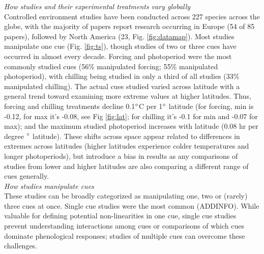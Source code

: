 \documentclass[11pt,letter]{article}
\begin{document}
\emph{How studies and their experimental treatments vary globally}\\
Controlled environment studies have been conducted across 227 species across the globe, with the majority of papers report research occurring in Europe (54 of 85 papers), followed by North America (23, Fig. \ref{fig:datamap}). Most studies manipulate one cue (Fig. \ref{fig:ts}), though studies of two or three cues have occurred in almost every decade. Forcing and photoperiod were the most commonly studied cues (56\% manipulated forcing; 55\% manipulated photoperiod), with chilling being studied in only a third of all studies (33\% manipulated chilling). The actual cues studied varied across latitude with a general trend toward examining more extreme values at higher latitudes. Thus, forcing and chilling treatments decline 0.1$\degree$C per 1$\degree$ latitude (for forcing, min is -0.12, for max it's -0.08, see Fig \ref{fig:lat}; for chilling it's -0.1 for min and -0.07 for max); and the maximum studied photoperiod increases with latitude (0.08 hr per degree $\degree$ latitude). These shifts across space appear related to differences in extremes across latitudes (higher latitudes experience colder temperatures and longer photoperiods), but introduce a bias in results as any comparisons of studies from lower and higher latitudes are also comparing a different range of cues generally. \\

\emph{How studies manipulate cues}\\
These studies can be broadly categorized as manipulating one, two or (rarely) three cues at once. Single cue studies were the most common (ADDINFO). While valuable for defining potential non-linearities in one cue, single cue studies prevent understanding interactions among cues or comparisons of which cues dominate phenological responses; studies of multiple cues can overcome these challenges. \\
\end{document}
